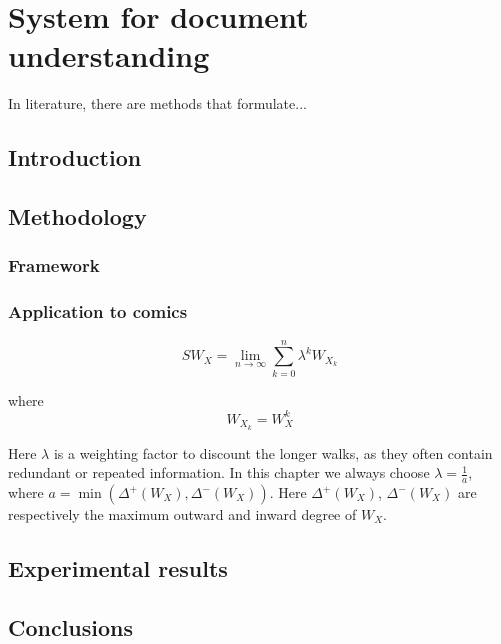 \chapter{System for document understanding} %
\label{chap:hp}
\graphicspath{{./chapters/8-hp/figs/}}

In literature, there are methods that formulate...

\section{Introduction}
\label{sec:hp:intro}


\section{Methodology}
\label{sec:hp:method}


\subsection{Framework}
\label{sub:hp:rw}


\subsection{Application to comics} %
\label{sub:hp:application_to_comics}


\begin{equation}
SW_X=\lim_{n\rightarrow \infty}\sum_{k=0}^n \lambda^k W_{X_k}
\label{eqn:pg:rw1}
\end{equation}

where
\begin{equation}
W_{X_k} = W_X^k
\end{equation}

Here $\lambda$ is a weighting factor to discount the longer walks, as they often contain redundant or repeated information. In this chapter we always choose $\lambda=\frac{1}{a}$, where $a=\min(\Delta^+(W_X),\Delta^-(W_X))$. Here $\Delta^+(W_X)$, $\Delta^-(W_X)$ are respectively the maximum outward and inward degree of $W_X$.

\section{Experimental results} %
\label{sec:hp:experimental_results}


\section{Conclusions}
\label{sec:hp:conclusion}

